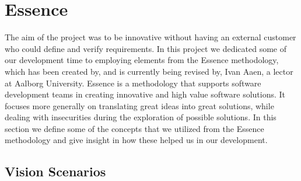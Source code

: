 
\section{Essence}
\label{sec:essence}

The aim of the project was to be innovative without having an external customer who could define and verify requirements. In this project we dedicated some of our development time to employing elements from the Essence methodology, which has been created by, and is currently being revised by, Ivan Aaen, a lector at Aalborg University. Essence is a methodology that supports software development teams in creating innovative and high value software solutions. It focuses more generally on translating great ideas into great solutions, while dealing with insecurities during the exploration of possible solutions. In this section we define some of the concepts that we utilized from the Essence methodology and give insight in how these helped us in our development.





\subsection{Vision Scenarios}
\label{sub:essence_vision_scenarios}


